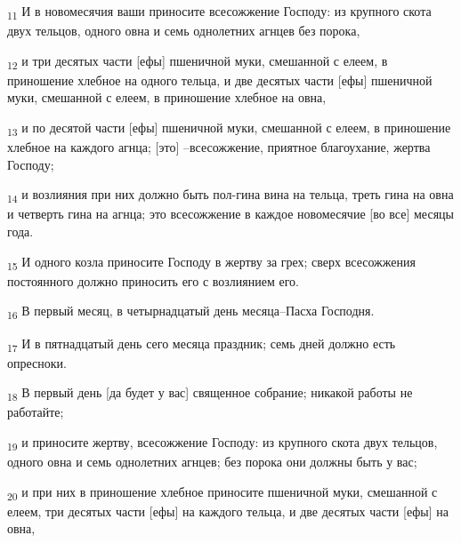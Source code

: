 \begin{tcolorbox}
\textsubscript{11} И в новомесячия ваши приносите всесожжение Господу: из крупного скота двух тельцов, одного овна и семь однолетних агнцев без порока,
\end{tcolorbox}
\begin{tcolorbox}
\textsubscript{12} и три десятых части [ефы] пшеничной муки, смешанной с елеем, в приношение хлебное на одного тельца, и две десятых части [ефы] пшеничной муки, смешанной с елеем, в приношение хлебное на овна,
\end{tcolorbox}
\begin{tcolorbox}
\textsubscript{13} и по десятой части [ефы] пшеничной муки, смешанной с елеем, в приношение хлебное на каждого агнца; [это] --всесожжение, приятное благоухание, жертва Господу;
\end{tcolorbox}
\begin{tcolorbox}
\textsubscript{14} и возлияния при них должно быть пол-гина вина на тельца, треть гина на овна и четверть гина на агнца; это всесожжение в каждое новомесячие [во все] месяцы года.
\end{tcolorbox}
\begin{tcolorbox}
\textsubscript{15} И одного козла приносите Господу в жертву за грех; сверх всесожжения постоянного должно приносить его с возлиянием его.
\end{tcolorbox}
\begin{tcolorbox}
\textsubscript{16} В первый месяц, в четырнадцатый день месяца--Пасха Господня.
\end{tcolorbox}
\begin{tcolorbox}
\textsubscript{17} И в пятнадцатый день сего месяца праздник; семь дней должно есть опресноки.
\end{tcolorbox}
\begin{tcolorbox}
\textsubscript{18} В первый день [да будет у вас] священное собрание; никакой работы не работайте;
\end{tcolorbox}
\begin{tcolorbox}
\textsubscript{19} и приносите жертву, всесожжение Господу: из крупного скота двух тельцов, одного овна и семь однолетних агнцев; без порока они должны быть у вас;
\end{tcolorbox}
\begin{tcolorbox}
\textsubscript{20} и при них в приношение хлебное приносите пшеничной муки, смешанной с елеем, три десятых части [ефы] на каждого тельца, и две десятых части [ефы] на овна,
\end{tcolorbox}
